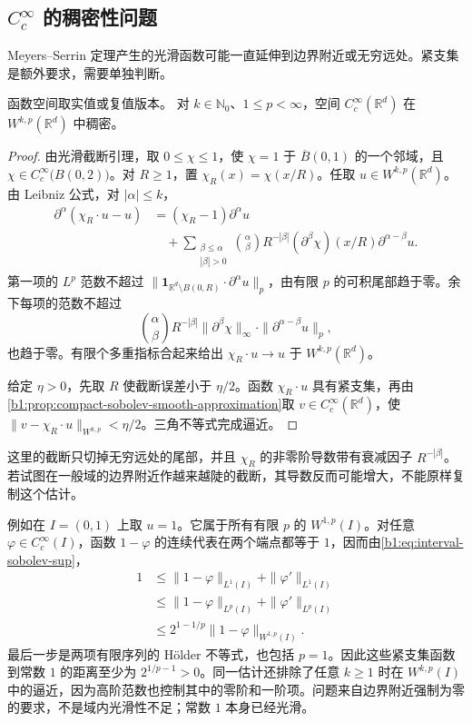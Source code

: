 \subsection{\texorpdfstring{\(C_c^\infty\)}{Cc∞} 的稠密性问题}
\label{b1:subsec:220104}

Meyers--Serrin 定理产生的光滑函数可能一直延伸到边界附近或无穷远处。紧支集是额外要求，需要单独判断。

\begin{theorem}\label{b1:thm:whole-space-sobolev-density}
函数空间取实值或复值版本。
对 \(k\in\mathbb N_0\)、\(1\leq p<\infty\)，空间 \(C_c^\infty(\mathbb R^d)\) 在 \(W^{k,p}(\mathbb R^d)\) 中稠密。
\end{theorem}
\begin{proof}
由光滑截断引理，取 \(0\leq\chi\leq1\)，使 \(\chi=1\) 于 \(\overline B(0,1)\) 的一个邻域，且 \(\chi\in C_c^\infty\bigl(B(0,2)\bigr)\)。对 \(R\geq1\)，置 \(\chi_R(x)=\chi(x/R)\)。任取 \(u\in W^{k,p}(\mathbb R^d)\)。由 Leibniz 公式，对 \(|\alpha|\leq k\)，
\[
 \begin{aligned}
 \partial^\alpha(\chi_R\cdot u-u)
 &=(\chi_R-1)\partial^\alpha u\\
 &\quad+\sum_{\substack{\beta\leq\alpha\\|\beta|>0}}
   \binom\alpha\beta R^{-|\beta|}
   (\partial^\beta\chi)(x/R)\partial^{\alpha-\beta}u.
 \end{aligned}
\]
第一项的 \(L^p\) 范数不超过
\(\|\mathbf1_{\mathbb R^d\setminus B(0,R)}\cdot\partial^\alpha u\|_p\)，由有限 \(p\) 的可积尾部趋于零。余下每项的范数不超过
\[
 \binom\alpha\beta R^{-|\beta|}
 \|\partial^\beta\chi\|_\infty\cdot\|\partial^{\alpha-\beta}u\|_p,
\]
也趋于零。有限个多重指标合起来给出 \(\chi_R\cdot u\to u\) 于 \(W^{k,p}(\mathbb R^d)\)。

给定 \(\eta>0\)，先取 \(R\) 使截断误差小于 \(\eta/2\)。函数 \(\chi_R\cdot u\) 具有紧支集，再由\cref{b1:prop:compact-sobolev-smooth-approximation}取 \(v\in C_c^\infty(\mathbb R^d)\)，使 \(\|v-\chi_R\cdot u\|_{W^{k,p}}<\eta/2\)。三角不等式完成逼近。
\end{proof}

这里的截断只切掉无穷远处的尾部，并且 \(\chi_R\) 的非零阶导数带有衰减因子 \(R^{-|\beta|}\)。若试图在一般域的边界附近作越来越陡的截断，其导数反而可能增大，不能原样复制这个估计。

\ProseParagraphBreak

例如在 \(I=(0,1)\) 上取 \(u=1\)。它属于所有有限 \(p\) 的 \(W^{1,p}(I)\)。对任意 \(\varphi\in C_c^\infty(I)\)，函数 \(1-\varphi\) 的连续代表在两个端点都等于 \(1\)，因而由\eqref{b1:eq:interval-sobolev-sup}，
\[
 \begin{aligned}
 1&\leq\|1-\varphi\|_{L^1(I)}+\|\varphi'\|_{L^1(I)}\\
  &\leq\|1-\varphi\|_{L^p(I)}+\|\varphi'\|_{L^p(I)}\\
  &\leq2^{1-1/p}\|1-\varphi\|_{W^{1,p}(I)}.
 \end{aligned}
\]
最后一步是两项有限序列的 Hölder 不等式，也包括 \(p=1\)。因此这些紧支集函数到常数 \(1\) 的距离至少为 \(2^{1/p-1}>0\)。同一估计还排除了任意 \(k\geq1\) 时在 \(W^{k,p}(I)\) 中的逼近，因为高阶范数也控制其中的零阶和一阶项。问题来自边界附近强制为零的要求，不是域内光滑性不足；常数 \(1\) 本身已经光滑。

